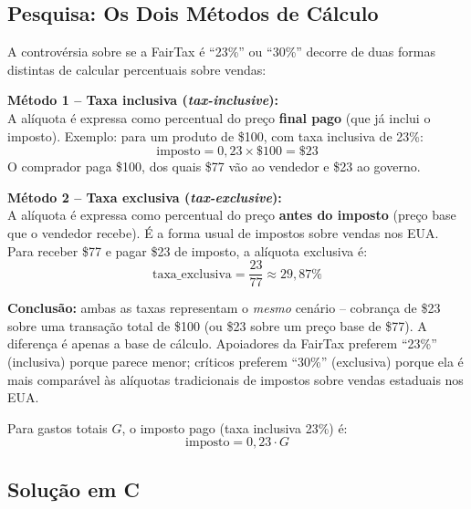 \documentclass[12pt,a4paper]{article}
\begin{document}
\subsection*{Pesquisa: Os Dois Métodos de Cálculo}

\begin{pesquisa}
A controvérsia sobre se a FairTax é ``23\%'' ou ``30\%'' decorre de duas formas
distintas de calcular percentuais sobre vendas:

\textbf{Método 1 -- Taxa inclusiva (\textit{tax-inclusive}):}\\
A alíquota é expressa como percentual do preço \textbf{final pago} (que já inclui
o imposto). Exemplo: para um produto de \$100, com taxa inclusiva de 23\%:
\[
  \text{imposto} = 0{,}23 \times \$100 = \$23
\]
O comprador paga \$100, dos quais \$77 vão ao vendedor e \$23 ao governo.

\textbf{Método 2 -- Taxa exclusiva (\textit{tax-exclusive}):}\\
A alíquota é expressa como percentual do preço \textbf{antes do imposto} (preço base
que o vendedor recebe). É a forma usual de impostos sobre vendas nos EUA. Para receber
\$77 e pagar \$23 de imposto, a alíquota exclusiva é:
\[
  \text{taxa\_exclusiva} = \frac{23}{77} \approx 29{,}87\%
\]

\textbf{Conclusão:} ambas as taxas representam o \textit{mesmo} cenário -- cobrança de
\$23 sobre uma transação total de \$100 (ou \$23 sobre um preço base de \$77). A diferença
é apenas a base de cálculo. Apoiadores da FairTax preferem ``23\%'' (inclusiva) porque
parece menor; críticos preferem ``30\%'' (exclusiva) porque ela é mais comparável às
alíquotas tradicionais de impostos sobre vendas estaduais nos EUA.

Para gastos totais $G$, o imposto pago (taxa inclusiva 23\%) é:
\[
  \text{imposto} = 0{,}23 \cdot G
\]
\end{pesquisa}

\subsection*{Solução em C}
\end{document}
